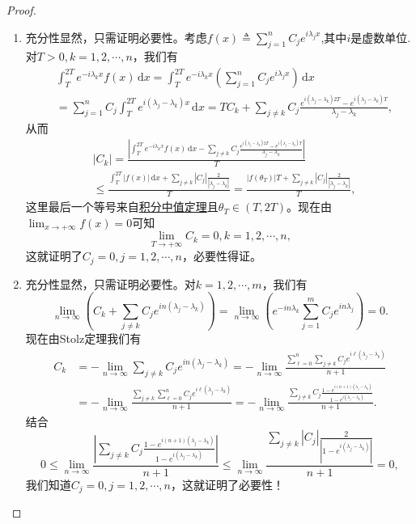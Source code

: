 \documentclass[../../main.tex]{subfiles}%
\begin{document}
\begin{proof}
\begin{enumerate}
\item 充分性显然，只需证明必要性。考虑$f(x)\triangleq\sum_{j=1}^n C_j e^{i\lambda_j x}$,其中$i$是虚数单位.对$T>0,k=1,2,\cdots,n$，我们有
\begin{align*}
&\int_T^{2T} e^{-i\lambda_k x}f(x)\,\mathrm{d}x=\int_T^{2T} e^{-i\lambda_k x}\left(\sum_{j=1}^n C_j e^{i\lambda_j x}\right)\,\mathrm{d}x\\
&=\sum_{j=1}^n C_j\int_T^{2T} e^{i(\lambda_j-\lambda_k)x}\,\mathrm{d}x=TC_k+\sum_{j\neq k} C_j\frac{e^{i(\lambda_j-\lambda_k)2T}-e^{i(\lambda_j-\lambda_k)T}}{\lambda_j-\lambda_k},
\end{align*}
从而
\begin{align*}
&|C_k|=\frac{\left|\int_T^{2T} e^{-i\lambda_k x}f(x)\,\mathrm{d}x-\sum\limits_{j\neq k} C_j\frac{e^{i(\lambda_j-\lambda_k)2T}-e^{i(\lambda_j-\lambda_k)T}}{\lambda_j-\lambda_k}\right|}{T}
\\
&\leqslant \frac{\int_T^{2T}|f(x)|\,\mathrm{d}x+\sum\limits_{j\neq k} |C_j|\frac{2}{|\lambda_j-\lambda_k|}}{T}=\frac{|f(\theta_T)|T+\sum\limits_{j\neq k} |C_j|\frac{2}{|\lambda_j-\lambda_k|}}{T},
\end{align*}
这里最后一个等号来自\hyperref[theorem:积分中值定理]{积分中值定理}且$\theta_T\in(T,2T)$。现在由$\lim_{x\to+\infty}f(x)=0$可知
\[
\lim_{T\to+\infty} C_k=0,k=1,2,\cdots,n,
\]
这就证明了$C_j=0,j=1,2,\cdots,n$，必要性得证。

\item 充分性显然，只需证明必要性。对$k=1,2,\cdots,m$，我们有
\[
\lim_{n\to\infty}\left(C_k+\sum_{j\neq k} C_j e^{in(\lambda_j-\lambda_k)}\right)=\lim_{n\to\infty}\left(e^{-in\lambda_k}\sum_{j=1}^m C_j e^{in\lambda_j}\right)=0.
\]
现在由Stolz定理我们有
\begin{align*}
C_k&=-\lim_{n\rightarrow \infty} \sum_{j\ne k}{C_je^{in(\lambda _j-\lambda _k)}}=-\lim_{n\rightarrow \infty} \frac{\sum\limits_{\ell =0}^n{\sum\limits_{j\ne k}{C_je^{i\ell (\lambda _j-\lambda _k)}}}}{n+1}
\\
&=-\lim_{n\rightarrow \infty} \frac{\sum\limits_{j\ne k}{\sum\limits_{\ell =0}^n{C_je^{i\ell (\lambda _j-\lambda _k)}}}}{n+1}=-\lim_{n\rightarrow \infty} \frac{\sum\limits_{j\ne k}{C_j\frac{1-e^{i(n+1)(\lambda _j-\lambda _k)}}{1-e^{i(\lambda _j-\lambda _k)}}}}{n+1}.
\end{align*}
结合
\[
0\leqslant \lim_{n\to\infty}\frac{\left|\sum\limits_{j\neq k} C_j\frac{1-e^{i(n+1)(\lambda_j-\lambda_k)}}{1-e^{i(\lambda_j-\lambda_k)}}\right|}{n+1}\leqslant \lim_{n\to\infty}\frac{\sum\limits_{j\neq k}|C_j|\frac{2}{|1-e^{i(\lambda_j-\lambda_k)}|}}{n+1}=0,
\]
我们知道$C_j=0,j=1,2,\cdots,n$，这就证明了必要性！
\end{enumerate}
\end{proof}
\end{document}
